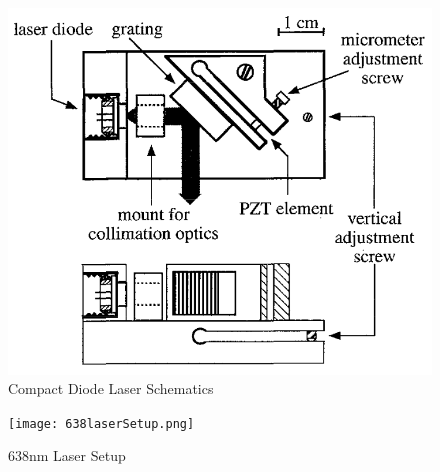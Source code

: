 \documentclass[12pt,A4Paper]{article}
\begin{document}
\begin{figure}[H]
    \centering
    \includegraphics[width=.8\textwidth]{compactDiodeLaserSchematics.png}
    \caption{Compact Diode Laser Schematics}
    \label{fig:compactDiodeLaserSchematics}
\end{figure}

\begin{figure}[H]
    \centering
    \texttt{[image: 638laserSetup.png]}
    \caption{638nm Laser Setup}
    \label{fig:638laserSetup}
\end{figure}
\end{document}
